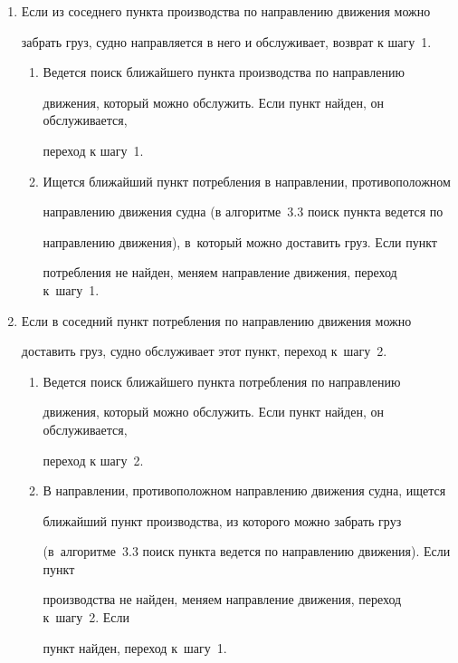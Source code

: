   \begin{enumerate}[1.]


  \item Если из соседнего пункта производства по направлению движения можно 


забрать груз, судно направляется в него и обслуживает, возврат к шагу~1.\\[-14pt]


  \begin{enumerate}[{1}.1.]


  \item  Ведется поиск ближайшего пункта производства по направлению 


движения, который можно обслужить. Если пункт найден, он обслуживается, 


переход к шагу~1.\\[-14pt]


  \item  Ищется ближайший пункт потребления в направлении, противоположном 


направлению движения судна (в алгоритме~3.3 поиск пункта ведется по 


направлению движения), в~который можно доставить груз. Если пункт 


потребления не найден, меняем направление движения, переход к~шагу~1.\\[-14pt]


  \end{enumerate}


  \item  Если в соседний пункт потребления по направлению движения можно 


доставить груз, судно обслуживает этот пункт, переход к~шагу~2.\\[-14pt]


  \begin{enumerate}[2.1.]


  \item  Ведется поиск ближайшего пункта потребления по направлению 


движения, который можно обслужить. Если пункт найден, он обслуживается, 


переход к шагу~2.\\[-14pt]


  \item  В направлении, противоположном направлению движения судна, ищется 


ближайший пункт производства, из которого можно забрать груз 


(в~алгоритме~3.3 поиск пункта ведется по направлению движения). Если пункт 


производства не найден, меняем направление движения, переход к~шагу~2. Если 


пункт найден, переход к~шагу~1.\\[-14pt]


  \end{enumerate}


  \end{enumerate}


